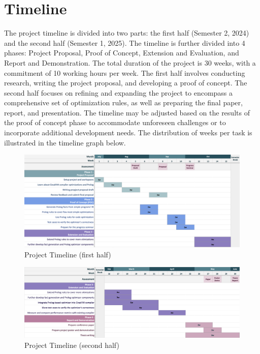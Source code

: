 \newpage

\section{Timeline}
The project timeline is divided into two parts: the first half (Semester 2, 2024) and the second half (Semester 1, 2025). The timeline is further divided into 4 phases: Project Proposal, Proof of Concept, Extension and Evaluation, and Report and Demonstration. The total duration of the project is 30 weeks, with a commitment of 10 working hours per week. The first half involves conducting research, writing the project proposal, and developing a proof of concept. The second half focuses on refining and expanding the project to encompass a comprehensive set of optimization rules, as well as preparing the final paper, report, and presentation. The timeline may be adjusted based on the results of the proof of concept phase to accommodate unforeseen challenges or to incorporate additional development needs.  The distribution of weeks per task is illustrated in the timeline graph below.

\begin{figure}[h]
    \includegraphics[width=1\textwidth]{Packages/PartA.png}
    \caption{Project Timeline (first half)}
\end{figure}
\begin{figure}[h]
    \includegraphics[width=1\textwidth]{Packages/PartB.png}
    \caption{Project Timeline (second half)}
\end{figure}

